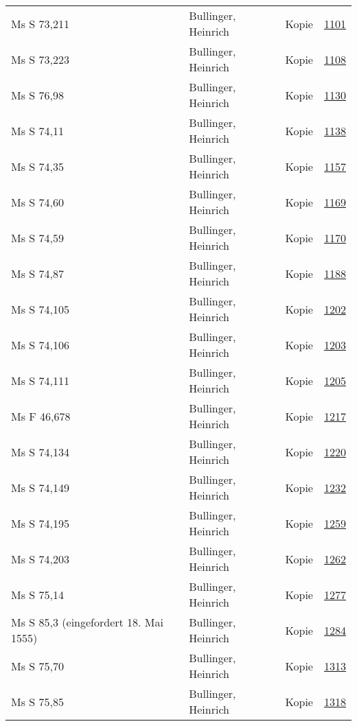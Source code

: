 \documentclass[10pt,a4paper,landscape]{report}
\begin{document}
\begin{longtable}{p{16cm}p{4cm}lr}
Ms S 73,211	&	Bullinger, Heinrich	&	Kopie	&	\href{http://130.60.24.72/assignment/1101}{1101}\\
Ms S 73,223	&	Bullinger, Heinrich	&	Kopie	&	\href{http://130.60.24.72/assignment/1108}{1108}\\
Ms S 76,98	&	Bullinger, Heinrich	&	Kopie	&	\href{http://130.60.24.72/assignment/1130}{1130}\\
Ms S 74,11	&	Bullinger, Heinrich	&	Kopie	&	\href{http://130.60.24.72/assignment/1138}{1138}\\
Ms S 74,35	&	Bullinger, Heinrich	&	Kopie	&	\href{http://130.60.24.72/assignment/1157}{1157}\\
Ms S 74,60	&	Bullinger, Heinrich	&	Kopie	&	\href{http://130.60.24.72/assignment/1169}{1169}\\
Ms S 74,59	&	Bullinger, Heinrich	&	Kopie	&	\href{http://130.60.24.72/assignment/1170}{1170}\\
Ms S 74,87	&	Bullinger, Heinrich	&	Kopie	&	\href{http://130.60.24.72/assignment/1188}{1188}\\
Ms S 74,105	&	Bullinger, Heinrich	&	Kopie	&	\href{http://130.60.24.72/assignment/1202}{1202}\\
Ms S 74,106	&	Bullinger, Heinrich	&	Kopie	&	\href{http://130.60.24.72/assignment/1203}{1203}\\
Ms S 74,111	&	Bullinger, Heinrich	&	Kopie	&	\href{http://130.60.24.72/assignment/1205}{1205}\\
Ms F 46,678	&	Bullinger, Heinrich	&	Kopie	&	\href{http://130.60.24.72/assignment/1217}{1217}\\
Ms S 74,134	&	Bullinger, Heinrich	&	Kopie	&	\href{http://130.60.24.72/assignment/1220}{1220}\\
Ms S 74,149	&	Bullinger, Heinrich	&	Kopie	&	\href{http://130.60.24.72/assignment/1232}{1232}\\
Ms S 74,195	&	Bullinger, Heinrich	&	Kopie	&	\href{http://130.60.24.72/assignment/1259}{1259}\\
Ms S 74,203	&	Bullinger, Heinrich	&	Kopie	&	\href{http://130.60.24.72/assignment/1262}{1262}\\
Ms S 75,14	&	Bullinger, Heinrich	&	Kopie	&	\href{http://130.60.24.72/assignment/1277}{1277}\\
Ms S 85,3 (eingefordert 18. Mai 1555)	&	Bullinger, Heinrich	&	Kopie	&	\href{http://130.60.24.72/assignment/1284}{1284}\\
Ms S 75,70	&	Bullinger, Heinrich	&	Kopie	&	\href{http://130.60.24.72/assignment/1313}{1313}\\
Ms S 75,85	&	Bullinger, Heinrich	&	Kopie	&	\href{http://130.60.24.72/assignment/1318}{1318}\\

\end{longtable}
\end{document}
